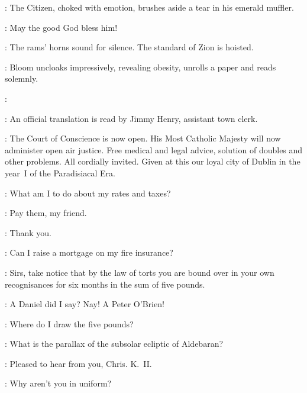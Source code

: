 :
The Citizen, choked with emotion, brushes aside a tear in his emerald muffler.

\Citizen:
May the good God bless him!

:
The rams' horns sound for silence.
The standard of Zion is hoisted.%

:
Bloom uncloaks impressively, revealing obesity, unrolls a paper and reads solemnly.

\Bloom:

:
An official translation is read by Jimmy Henry, assistant town clerk.

\JimmyHenry:
The Court of Conscience is now open.
His Most Catholic Majesty will now administer open air justice.
Free medical and legal advice, solution of doubles and other problems.
All cordially invited.
Given at this our loyal city of Dublin in the year~I of the Paradisiacal Era.

\PaddyLeonard[1]:
What am I to do about my rates and taxes?

\Bloom:
Pay them, my friend.

\PaddyLeonard[1]:
Thank you.

\NoseyFlynn[2]:
Can I raise a mortgage on my fire insurance?%

\Bloom:
Sirs, take notice that by the law of torts you are bound over
in your own recognisances for six months in the sum of five pounds.

\JJOM[1]:
A Daniel did I say?
Nay! A Peter O'Brien!

\NoseyFlynn[2]:
Where do I draw the five pounds?

% 

\ChrisCallinan[1]:
What is the parallax of the subsolar ecliptic of Aldebaran?

\Bloom:
Pleased to hear from you, Chris. K.~II.

\JoeHynes[2]:
Why aren't you in uniform?%

